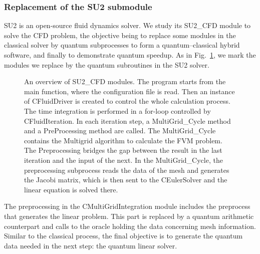 \documentclass[%
 reprint,
 amsmath,amssymb,
pra,
]{revtex4-1}
\begin{document}
\subsubsection{Replacement of the SU2 submodule}

SU2 is an open-source fluid dynamics solver. We study its SU2\_CFD module to solve the CFD problem, the objective being to replace some modules in the classical solver by quantum subprocesses to form a quantum--classical hybrid software, and finally to demonstrate quantum speedup. As in Fig.~\ref{SU2modules}, we mark the modules we replace by the quantum subroutines in the SU2 solver.

\begin{figure}[htbp]
     \caption{An overview of SU2\_CFD modules. The program starts from the main function, where the configuration file is read. Then an instance of CFluidDriver is created to control the whole calculation process. The time integration is performed in a for-loop controlled by CFluidIteration. In each iteration step, a MultiGrid\_Cycle method and a PreProcessing method are called. The MultiGrid\_Cycle contains the Multigrid algorithm to calculate the FVM problem. The Preprocessing bridges the gap between the result in the last iteration and the input of the next. In the MultiGrid\_Cycle, the preprocessing subprocess reads the data of the mesh and generates the Jacobi matrix, which is then sent to the CEulerSolver and the linear equation is solved there.}
    \label{SU2modules}
\end{figure}

The preprocessing in the CMultiGridIntegration module includes the preprocess that generates the linear problem. This part is replaced by a quantum arithmetic counterpart and calls to the oracle holding the data concerning mesh information. Similar to the classical process, the final objective is to generate the quantum data needed in the next step: the quantum linear solver.
\end{document}
